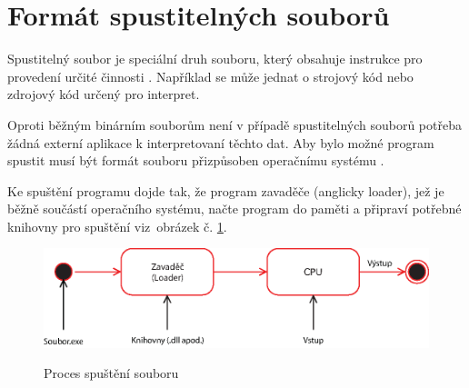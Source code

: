 \section{Formát spustitelných souborů}







Spustitelný soubor je speciální druh souboru, který obsahuje instrukce pro provedení určité činnosti \cite{executable_lifewire}. Například se může jednat o strojový kód nebo zdrojový kód určený pro interpret. %


Oproti běžným binárním souborům není v případě spustitelných souborů potřeba žádná externí aplikace k interpretovaní těchto dat. Aby bylo možné program spustit musí být formát souboru přizpůsoben operačnímu systému \cite{wiki:Executable}.

Ke spuštění programu dojde tak, že program zavaděče (anglicky loader), jež je běžně součástí operačního systému, načte program do paměti a připraví potřebné knihovny pro spuštění viz~obrázek č. \ref{fig:file_execution}.

\begin{figure}[!ht]
    \centering
    \caption{Proces spuštění souboru}
    \includegraphics[width=150mm,scale=0.5]{Figures/obrazky/Execution.eps}
    \label{fig:file_execution}
\end{figure}

